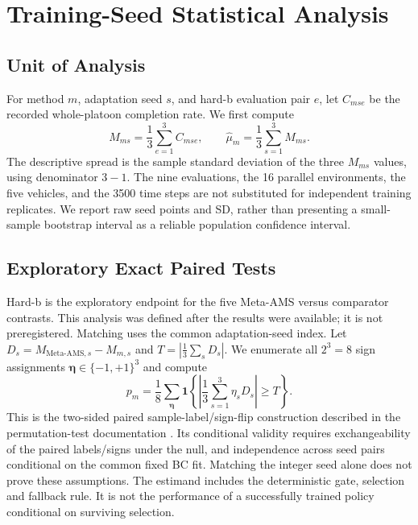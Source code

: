 \documentclass[lettersize,journal]{IEEEtran}
\begin{document}
\section{Training-Seed Statistical Analysis}
\subsection{Unit of Analysis}
For method $m$, adaptation seed $s$, and hard-b evaluation pair $e$, let $C_{mse}$ be the recorded whole-platoon completion rate. We first compute
\begin{equation}
M_{ms}=\frac{1}{3}\sum_{e=1}^{3}C_{mse},\qquad
\widehat{\mu}_m=\frac{1}{3}\sum_{s=1}^{3}M_{ms}.
\end{equation}
The descriptive spread is the sample standard deviation of the three $M_{ms}$ values, using denominator $3-1$. The nine evaluations, the 16 parallel environments, the five vehicles, and the 3500 time steps are not substituted for independent training replicates. We report raw seed points and SD, rather than presenting a small-sample bootstrap interval as a reliable population confidence interval.

\subsection{Exploratory Exact Paired Tests}
Hard-b is the exploratory endpoint for the five Meta-AMS versus comparator contrasts. This analysis was defined after the results were available; it is not preregistered. Matching uses the common adaptation-seed index. Let $D_s=M_{\mathrm{Meta\text{-}AMS},s}-M_{m,s}$ and $T=|\frac{1}{3}\sum_s D_s|$. We enumerate all $2^3=8$ sign assignments $\boldsymbol\eta\in\{-1,+1\}^3$ and compute
\begin{equation}
p_m=\frac{1}{8}\sum_{\boldsymbol\eta}
\mathbf{1}\!\left\{\left|\frac{1}{3}\sum_{s=1}^{3}\eta_sD_s\right|\geq T\right\}.
\end{equation}
This is the two-sided paired sample-label/sign-flip construction described in the permutation-test documentation \cite{scipyperm}. Its conditional validity requires exchangeability of the paired labels/signs under the null, and independence across seed pairs conditional on the common fixed BC fit. Matching the integer seed alone does not prove these assumptions. The estimand includes the deterministic gate, selection and fallback rule. It is not the performance of a successfully trained policy conditional on surviving selection.


\end{document}
